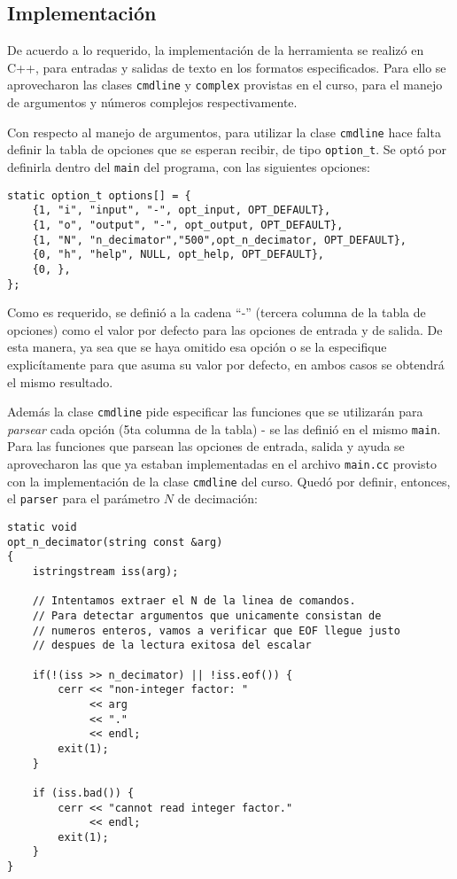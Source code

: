 \newpage


\subsection{Implementación}
 De acuerdo a lo requerido, la implementación de la herramienta se realizó en C++, para entradas y salidas de texto en los formatos especificados. Para ello se aprovecharon las clases \texttt{cmdline} y \texttt{complex} provistas en el curso, para el manejo de argumentos y números complejos respectivamente.

 Con respecto al manejo de argumentos, para utilizar la clase \texttt{cmdline} hace falta definir la tabla de opciones que se esperan recibir, de tipo \texttt{option\_t}. Se optó por definirla dentro del \texttt{main} del programa, con las siguientes opciones:

%	

\lstset{language=C++}
\begin{lstlisting}[frame=single]
static option_t options[] = {
	{1, "i", "input", "-", opt_input, OPT_DEFAULT},
	{1, "o", "output", "-", opt_output, OPT_DEFAULT},
	{1, "N", "n_decimator","500",opt_n_decimator, OPT_DEFAULT},
	{0, "h", "help", NULL, opt_help, OPT_DEFAULT},
	{0, },
};
\end{lstlisting}

Como es requerido, se definió a la cadena ``-'' (tercera columna de la tabla de opciones) como el valor por defecto para las opciones de entrada y de salida. De esta manera, ya sea que se haya omitido esa opción o se la especifique explicítamente para que asuma su valor por defecto, en ambos casos se  obtendrá el mismo resultado.

Además la clase \texttt{cmdline} pide especificar las funciones que se utilizarán para \emph{parsear} cada opción (5ta columna de la tabla) - se las definió en el mismo \texttt{main}. Para las funciones que parsean las opciones de entrada, salida y ayuda se aprovecharon las que ya estaban implementadas en el archivo \texttt{main.cc} provisto con la implementación de la clase \texttt{cmdline} del curso. Quedó por definir, entonces, el \texttt{parser} para el parámetro $N$ de decimación:


\lstset{language=C++} 
\begin{lstlisting}[frame=single]
static void
opt_n_decimator(string const &arg)
{
	istringstream iss(arg);

	// Intentamos extraer el N de la linea de comandos.
	// Para detectar argumentos que unicamente consistan de
	// numeros enteros, vamos a verificar que EOF llegue justo
	// despues de la lectura exitosa del escalar
	
	if(!(iss >> n_decimator) || !iss.eof()) {
		cerr << "non-integer factor: "
		     << arg
		     << "."
		     << endl;
		exit(1);
	}

	if (iss.bad()) {
		cerr << "cannot read integer factor."
		     << endl;
		exit(1);
	}
}
\end{lstlisting}

